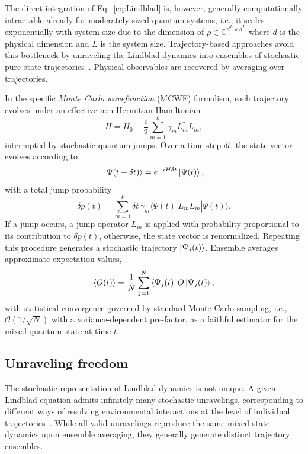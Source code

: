 \documentclass[aps, pra, superscriptaddress, reprint, floatfix]{revtex4-2}
\theoremstyle{plain}
\begin{document}
The direct integration of Eq.~\eqref{eq:Lindblad} is, however, generally computationally intractable  
already for moderately sized quantum systems, i.e., it scales exponentially with system size due to the dimension of $\rho \in \mathbb{C}^{d^L \times d^L}$ where $d$ is the physical dimension and $L$ is the system size.
Trajectory-based approaches avoid this bottleneck by unraveling the Lindblad dynamics into ensembles of stochastic pure state trajectories~\cite{Dalibard_1992, Carmichael_1993, Molmer_92, Wiseman_Milburn_2009}. Physical observables are recovered by averaging over trajectories.

In the specific \emph{Monte Carlo wavefunction} (MCWF) formalism, each trajectory evolves under an effective non-Hermitian Hamiltonian
\begin{equation}
\label{eq:Heff}
H = H_0 - \frac{i}{2}\sum_{m=1}^k \gamma_m L_m^\dagger L_m,
\end{equation}
interrupted by stochastic quantum jumps. Over a time step $\delta t$, the 
state vector evolves according to
\begin{equation}
\ket{\Psi(t+\delta t)} = e^{-iH\delta t}\ket{\Psi(t)},
\end{equation}
with a total jump probability
\begin{equation}
\delta p(t)
= \sum_{m=1}^k \delta t\, \gamma_m
\langle \Psi(t) | L_m^\dagger L_m | \Psi(t) \rangle.
\end{equation}
If a jump occurs, a jump operator $L_m$ is applied with probability proportional to its contribution to $\delta p(t)$, otherwise, the state vector is renormalized. Repeating this procedure generates a stochastic trajectory $\ket{\Psi_j(t)}$. Ensemble 
averages approximate expectation values,
\begin{equation}
\langle O(t) \rangle
= \frac{1}{N}\sum_{j=1}^N
\bra{\Psi_j(t)} O \ket{\Psi_j(t)} ,
\end{equation}
with statistical convergence governed by standard Monte Carlo sampling, i.e., $\mathcal{O}(1/\sqrt{N})$ with a variance-dependent pre-factor, as a faithful estimator for the mixed quantum state at time $t$.

\subsection{Unraveling freedom}
The stochastic representation of Lindblad dynamics is not unique. A given Lindblad equation admits infinitely many stochastic unravelings, corresponding to different ways of resolving environmental interactions at the level of individual trajectories~\cite{Wiseman_Milburn_2009}. While all valid unravelings reproduce the same mixed state dynamics upon ensemble averaging, they generally generate distinct trajectory ensembles.
\end{document}
